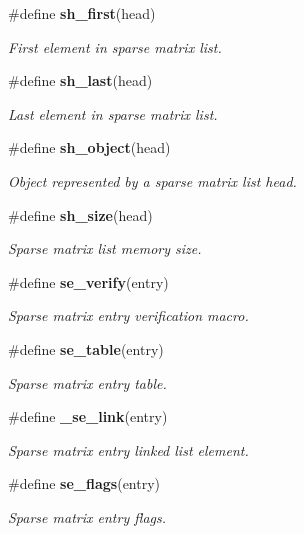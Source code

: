 \begin{CompactItemize}
\#define {\bf sh\_\-first}(head)
\begin{CompactList}\small\item\em First element in sparse matrix list.\item\end{CompactList}\item 
\#define {\bf sh\_\-last}(head)
\begin{CompactList}\small\item\em Last element in sparse matrix list.\item\end{CompactList}\item 
\#define {\bf sh\_\-object}(head)
\begin{CompactList}\small\item\em Object represented by a sparse matrix list head.\item\end{CompactList}\item 
\#define {\bf sh\_\-size}(head)
\begin{CompactList}\small\item\em Sparse matrix list memory size.\item\end{CompactList}\item 
\#define {\bf se\_\-verify}(entry)
\begin{CompactList}\small\item\em Sparse matrix entry verification macro.\item\end{CompactList}\item 
\#define {\bf se\_\-table}(entry)
\begin{CompactList}\small\item\em Sparse matrix entry table.\item\end{CompactList}\item 
\#define {\bf \_\-se\_\-link}(entry)
\begin{CompactList}\small\item\em Sparse matrix entry linked list element.\item\end{CompactList}\item 
\#define {\bf se\_\-flags}(entry)
\begin{CompactList}\small\item\em Sparse matrix entry flags.\item\end{CompactList}\item 

\end{CompactItemize}
